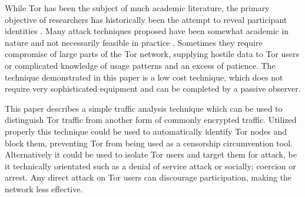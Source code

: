 \documentclass{ecuthesis}
\begin{document}
While Tor has been the subject of much academic literature, the primary
objective of researchers has historically been the attempt to reveal participant
identities \parencite[3]{Murdoch:2005p325}.  Many attack techniques proposed
have been somewhat academic in nature and not necessarily feasible in practice
\parencite{Raccoon:2008fk}. Sometimes they require compromise of large parts of
the Tor network, supplying hostile data to Tor users or complicated knowledge of
usage patterns and an excess of patience. The technique demonstrated in this
paper is a low cost technique, which does not require very sophisticated
equipment and can be completed by a passive observer.

This paper describes a simple traffic analysis technique which can be used to
distinguish Tor traffic from another form of commonly encrypted traffic.
Utilized properly this technique could be used to automatically identify Tor
nodes and block them, preventing Tor from being used as a censorship
circumvention tool.  Alternatively it could be used to isolate Tor users and
target them for attack, be it technically orientated such as a denial of service
attack or socially; coercion or arrest. Any direct attack on Tor users can
discourage participation, making the network less effective.



\end{document}

